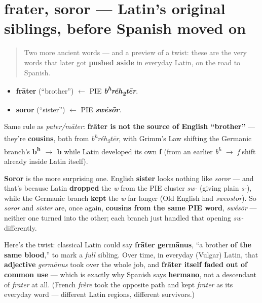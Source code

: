 \section[frater, soror]{frater, soror — Latin's original siblings, before Spanish moved on}

\label{lesson:LA-C07-frater-soror}



\begin{quote}
Two more ancient words — and a preview of a twist: these are the very words that later got \textbf{pushed aside} in everyday Latin, on the road to Spanish.
\end{quote}

\begin{cousinweb}
\begin{itemize}
\raggedright
  \item \textbf{frāter} (\textquotedblleft{}brother\textquotedblright{}) $\leftarrow$ PIE \emph{\textbf{b\textsuperscript{h}réh\textsubscript{2}tēr}}.
  \item \textbf{soror} (\textquotedblleft{}sister\textquotedblright{}) $\leftarrow$ PIE \emph{\textbf{swésōr}}.
\end{itemize}
\end{cousinweb}

\begin{cousinweb}
Same rule as \emph{pater/māter}: \textbf{frāter is not the source of English \textquotedblleft{}brother\textquotedblright{}} — they're \textbf{cousins}, both from \emph{b\textsuperscript{h}réh\textsubscript{2}tēr}, with Grimm's Law shifting the Germanic branch's \textbf{b\textsuperscript{h} $\to$ b} while Latin developed its own \textbf{f} (from an earlier \emph{b\textsuperscript{h} $\to$ f} shift already inside Latin itself).

\textbf{Soror} is the more surprising one. English \textbf{sister} looks nothing like \emph{soror} — and that's because Latin \textbf{dropped} the \emph{w} from the PIE cluster \emph{sw-} (giving plain \emph{s-}), while the Germanic branch \textbf{kept} the \emph{w} far longer (Old English had \emph{sweostor}). So \emph{soror} and \emph{sister} are, once again, \textbf{cousins from the same PIE word}, \emph{swésōr} — neither one turned into the other; each branch just handled that opening \emph{sw-} differently.
\end{cousinweb}

\begin{culture}
Here's the twist: classical Latin could say \textbf{frāter germānus}, \textquotedblleft{}a brother \textbf{of the same blood},\textquotedblright{} to mark a \emph{full} sibling. Over time, in everyday (Vulgar) Latin, that \textbf{adjective} \emph{germānus} took over the whole job, and \textbf{frāter itself faded out of common use} — which is exactly why Spanish says \textbf{hermano}, not a descendant of \emph{frāter} at all. (French \emph{frère} took the opposite path and kept \emph{frāter} as its everyday word — different Latin regions, different survivors.)
\end{culture}

